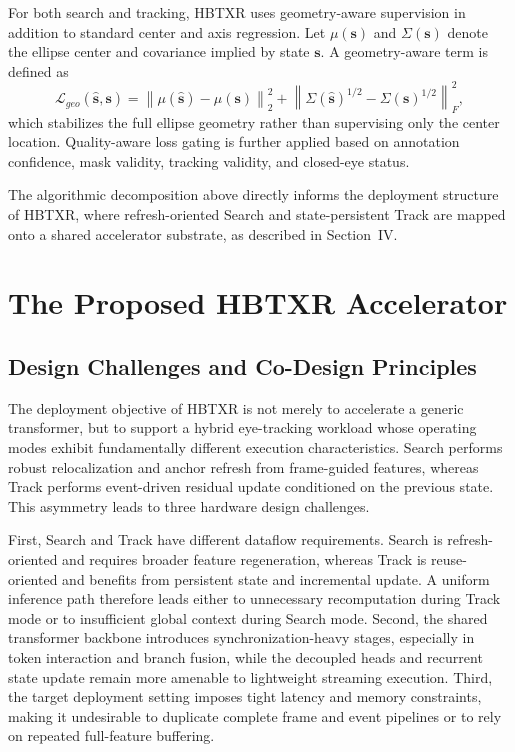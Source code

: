 ﻿\documentclass[journal]{IEEEtran}
\begin{document}
For both search and tracking, HBTXR uses geometry-aware supervision in addition to standard center and axis regression. Let \(\mu(\mathbf{s})\) and \(\Sigma(\mathbf{s})\) denote the ellipse center and covariance implied by state \(\mathbf{s}\). A geometry-aware term is defined as
\begin{equation}
\mathcal{L}_{geo}(\hat{\mathbf{s}}, \mathbf{s})
=
\left\|
\mu(\hat{\mathbf{s}})-\mu(\mathbf{s})
\right\|_2^2
+
\left\|
\Sigma(\hat{\mathbf{s}})^{1/2}-\Sigma(\mathbf{s})^{1/2}
\right\|_F^2,
\label{eq:geo_loss}
\end{equation}
which stabilizes the full ellipse geometry rather than supervising only the center location. Quality-aware loss gating is further applied based on annotation confidence, mask validity, tracking validity, and closed-eye status.

The algorithmic decomposition above directly informs the deployment structure of HBTXR, where refresh-oriented Search and state-persistent Track are mapped onto a shared accelerator substrate, as described in Section~IV.

\section{The Proposed HBTXR Accelerator}

\subsection{Design Challenges and Co-Design Principles}

The deployment objective of HBTXR is not merely to accelerate a generic transformer, but to support a hybrid eye-tracking workload whose operating modes exhibit fundamentally different execution characteristics. Search performs robust relocalization and anchor refresh from frame-guided features, whereas Track performs event-driven residual update conditioned on the previous state. This asymmetry leads to three hardware design challenges.

First, Search and Track have different dataflow requirements. Search is refresh-oriented and requires broader feature regeneration, whereas Track is reuse-oriented and benefits from persistent state and incremental update. A uniform inference path therefore leads either to unnecessary recomputation during Track mode or to insufficient global context during Search mode. Second, the shared transformer backbone introduces synchronization-heavy stages, especially in token interaction and branch fusion, while the decoupled heads and recurrent state update remain more amenable to lightweight streaming execution. Third, the target deployment setting imposes tight latency and memory constraints, making it undesirable to duplicate complete frame and event pipelines or to rely on repeated full-feature buffering.
\end{document}
